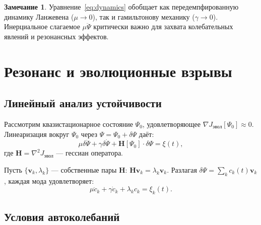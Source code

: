 \documentclass[11pt,a4paper]{article}
\theoremstyle{plain}
\theoremstyle{definition}
\newtheorem{remark}[theorem]{Замечание}
\theoremstyle{remark}
\newcommand{\grad}{\nabla}
\begin{document}
\begin{remark}
Уравнение~\eqref{eq:dynamics} обобщает как передемпфированную динамику Ланжевена ($\mu \to 0$), так и гамильтонову механику ($\gamma \to 0$). Инерциальное слагаемое $\mu \ddot{\Psi}$ критически важно для захвата колебательных явлений и резонансных эффектов.
\end{remark}

\section{Резонанс и эволюционные взрывы}
\label{sec:resonance}

\subsection{Линейный анализ устойчивости}

Рассмотрим квазистационарное состояние $\Psi_0$, удовлетворяющее $\grad J_{\text{эвол}}[\Psi_0] \approx 0$. Линеаризация вокруг $\Psi_0$ через $\Psi = \Psi_0 + \delta\Psi$ даёт:
\begin{equation}
\mu \delta\ddot{\Psi} + \gamma \delta\dot{\Psi} + \mathbf{H}[\Psi_0] \cdot \delta\Psi = \xi(t),
\label{eq:linearized}
\end{equation}
где $\mathbf{H} = \grad^2 J_{\text{эвол}}$ --- гессиан оператора.

Пусть $\{\mathbf{v}_k, \lambda_k\}$ --- собственные пары $\mathbf{H}$: $\mathbf{H} \mathbf{v}_k = \lambda_k \mathbf{v}_k$. Разлагая $\delta\Psi = \sum_k c_k(t) \mathbf{v}_k$, каждая мода удовлетворяет:
\begin{equation}
\mu \ddot{c}_k + \gamma \dot{c}_k + \lambda_k c_k = \xi_k(t).
\label{eq:mode_equation}
\end{equation}

\subsection{Условия автоколебаний}
\end{document}
